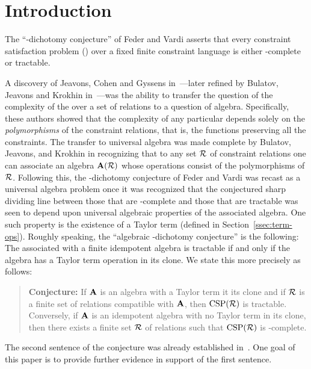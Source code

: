 



\section{Introduction}
\label{sec:introduction}
The ``\csp-dichotomy conjecture'' of Feder and Vardi asserts that every constraint satisfaction
problem (\csp) over a fixed finite constraint language is either \NP-complete or tractable.

A discovery of Jeavons, Cohen and Gyssens in~\cite{MR1481313}---later refined by Bulatov,
Jeavons and Krokhin in~\cite{MR2137072}---was the ability to transfer the question of the 
complexity of the \csp over a set of relations to a question of algebra. 
Specifically, these authors showed that the complexity of any particular \csp 
depends solely on the \emph{polymorphisms} of the constraint relations, 
that is, the functions preserving all the constraints. 
The transfer to universal algebra was made complete by Bulatov, Jeavons, and Krokhin 
in recognizing that to any set $\mathcal{R}$ of constraint relations one can
associate an algebra $\mathbf{A}(\mathcal{R})$ whose operations consist of the polymorphisms
of $\mathcal{R}$. Following this, the \csp-dichotomy conjecture
of Feder and Vardi was recast as a universal algebra problem once it was
recognized that the conjectured sharp dividing line between those \csps that are
\NP-complete and those that are tractable was seen to depend upon
universal algebraic properties of the associated algebra. 
One such property is the existence of a Taylor term 
(defined in Section~\ref{ssec:term-ops}). Roughly speaking,
the ``algebraic \csp-dichotomy conjecture'' is the following:
The \csp associated with a finite idempotent algebra
is tractable if and only if the algebra has a Taylor term operation in its
clone. We state this more precisely as follows:

\begin{quote}
  {\bf Conjecture:} If $\mathbf{A}$ is an algebra with a Taylor term it its
  clone and if $\mathcal{R}$ is a finite set of relations compatible with $\mathbf{A}$, then  
  $\operatorname{CSP}(\mathcal{R})$ is tractable.  Conversely, if $\mathbf{A}$ is an idempotent algebra with
  no Taylor term in its clone, then there exists a finite set $\mathcal{R}$ of relations
  such that $\operatorname{CSP}(\mathcal{R})$ is \NP-complete.
\end{quote}
The second sentence of the conjecture was already
established in~\cite{MR2137072}. One goal of this paper is to provide further
evidence in support of the first sentence.

